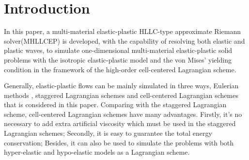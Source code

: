 \documentclass[review]{elsarticle}
\begin{document}

\section{Introduction}

In this paper, a multi-material elastic-plastic HLLC-type approximate Riemann solver(MHLLCEP) is developed, with the capability of resolving both elastic and plastic waves, to simulate one-dimensional  multi-material elastic-plastic solid problems with the isotropic elastic-plastic model \cite{wilkins1963calculation} and  the von Mises' yielding condition in the framework of the  high-order cell-centered Lagrangian scheme.

Generally, elastic-plastic flows can be mainly simulated in three ways, Eulerian methods \cite{trangenstein1991higher,miller2001high,barton2009exact}, staggered Lagrangian schemes \cite{wilkins1963calculation} and cell-centered Lagrangian schemes \cite{burton2013cell,kluth2010discretization,maire2013nominally,cheng2017third} that  is considered in this paper. Comparing with the staggered Lagrangian scheme, cell-centered Lagrangian  schemes  have many advantages. Firstly, it's no necessary to add  extra artificial viscosity  which  must be used in the staggered Lagrangian schemes; Secondly, it is easy to guarantee the total energy conservation; Besides, it can also be used to simulate the problems with both  hyper-elastic and hypo-elastic models  \cite{burton2013cell,kluth2010discretization,maire2013nominally,cheng2017third}  as a Lagrangian scheme.
\end{document}
